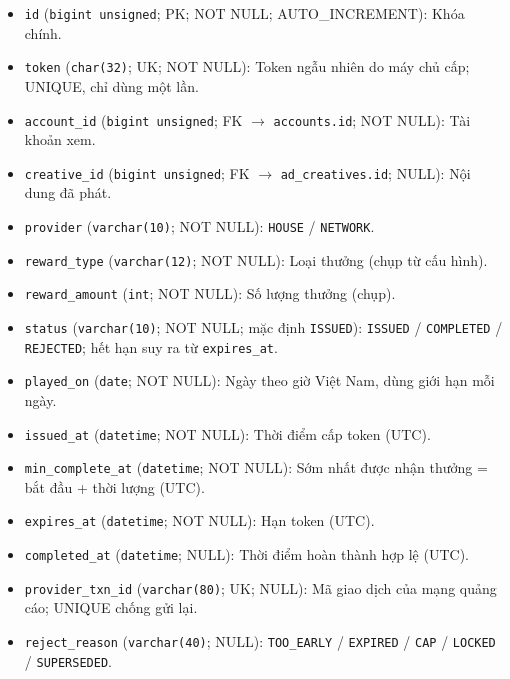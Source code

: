 \begin{itemize}

\item \texttt{id} (\texttt{bigint unsigned}; PK; NOT NULL; AUTO_INCREMENT): Khóa chính.

\item \texttt{token} (\texttt{char(32)}; UK; NOT NULL): Token ngẫu nhiên do máy chủ cấp; UNIQUE, chỉ dùng một lần.

\item \texttt{account\_id} (\texttt{bigint unsigned}; FK $\rightarrow$ \texttt{accounts.id}; NOT NULL): Tài khoản xem.

\item \texttt{creative\_id} (\texttt{bigint unsigned}; FK $\rightarrow$ \texttt{ad\_creatives.id}; NULL): Nội dung đã phát.

\item \texttt{provider} (\texttt{varchar(10)}; NOT NULL): \texttt{HOUSE} / \texttt{NETWORK}.

\item \texttt{reward\_type} (\texttt{varchar(12)}; NOT NULL): Loại thưởng (chụp từ cấu hình).

\item \texttt{reward\_amount} (\texttt{int}; NOT NULL): Số lượng thưởng (chụp).

\item \texttt{status} (\texttt{varchar(10)}; NOT NULL; mặc định \texttt{ISSUED}): \texttt{ISSUED} / \texttt{COMPLETED} / \texttt{REJECTED}; hết hạn suy ra từ \texttt{expires\_at}.

\item \texttt{played\_on} (\texttt{date}; NOT NULL): Ngày theo giờ Việt Nam, dùng giới hạn mỗi ngày.

\item \texttt{issued\_at} (\texttt{datetime}; NOT NULL): Thời điểm cấp token (UTC).

\item \texttt{min\_complete\_at} (\texttt{datetime}; NOT NULL): Sớm nhất được nhận thưởng = bắt đầu + thời lượng (UTC).

\item \texttt{expires\_at} (\texttt{datetime}; NOT NULL): Hạn token (UTC).

\item \texttt{completed\_at} (\texttt{datetime}; NULL): Thời điểm hoàn thành hợp lệ (UTC).

\item \texttt{provider\_txn\_id} (\texttt{varchar(80)}; UK; NULL): Mã giao dịch của mạng quảng cáo; UNIQUE chống gửi lại.

\item \texttt{reject\_reason} (\texttt{varchar(40)}; NULL): \texttt{TOO\_EARLY} / \texttt{EXPIRED} / \texttt{CAP} / \texttt{LOCKED} / \texttt{SUPERSEDED}.

\end{itemize}


